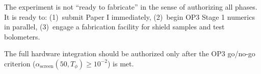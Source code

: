 \documentclass[11pt,letterpaper]{article}
\newcommand{\asc}{\alpha_{\mathrm{screen}}}
\begin{document}
The experiment is not ``ready to fabricate'' in the sense of authorizing all phases.
It is ready to:
(1)~submit Paper I immediately,
(2)~begin OP3 Stage 1 numerics in parallel,
(3)~engage a fabrication facility for shield samples and test bolometers.

The full hardware integration should be authorized only after the OP3 go/no-go
criterion ($\asc(50,T_\phi) \geq 10^{-2}$) is met.
\end{document}
